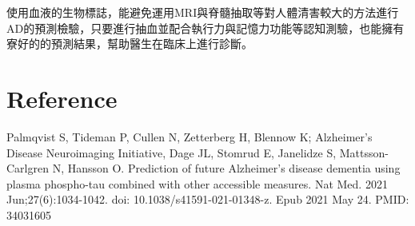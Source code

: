 使用血液的生物標誌，能避免運用MRI與脊髓抽取等對人體清害較大的方法進行AD的預測檢驗，只要進行抽血並配合執行力與記憶力功能等認知測驗，也能擁有寮好的的預測結果，幫助醫生在臨床上進行診斷。

\section{Reference}

Palmqvist S, Tideman P, Cullen N, Zetterberg H, Blennow K; Alzheimer’s Disease Neuroimaging Initiative, Dage JL, Stomrud E, Janelidze S, Mattsson-Carlgren N, Hansson O. Prediction of future Alzheimer's disease dementia using plasma phospho-tau combined with other accessible measures. Nat Med. 2021 Jun;27(6):1034-1042. doi: 10.1038/s41591-021-01348-z. Epub 2021 May 24. PMID: 34031605